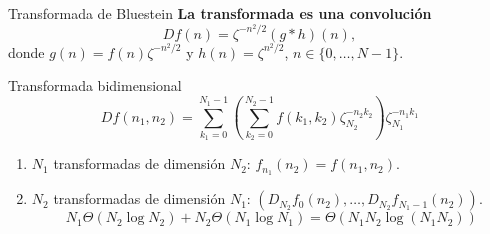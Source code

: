 \documentclass[11pt,compress]{beamer}
\newcommand\C{\mathbb{C}}
\newcommand\Z{\mathbb{Z}}
\newcommand\N{\mathbb{N}}
\begin{document}

\begin{frame}{}

\begin{block}{Transformada de Bluestein}
    \textbf{La transformada es una convolución}
    \[Df(n) = \zeta^{-n^2/2}(g \ast h)(n),\]
    donde $g(n) = f(n) \zeta^{-n^2/2}$ y $h(n) = \zeta^{n^2/2}$, $n \in \{0,\dots,N-1\}$.
\end{block}

\begin{block}{Transformada bidimensional}
    \[ Df(n_1,n_2) = \sum_{k_1=0}^{N_1-1}\left(\sum_{k_2=0}^{N_2-1} f(k_1,k_2)\zeta_{N_2}^{-n_2k_2}\right)\zeta_{N_1}^{-n_1k_1} \]
    
    \begin{enumerate}
        \item $N_1$ transformadas de dimensión $N_2$: $f_{n_1}(n_2) = f(n_1,n_2)$.
        \item $N_2$ transformadas de dimensión $N_1$: $(D_{N_2}f_0(n_2),\dots,D_{N_2}f_{N_1-1}(n_2))$.
        \[ N_1 \Theta(N_2\log N_2) + N_2 \Theta(N_1 \log N_1) = \Theta(N_1N_2 \log(N_1N_2)) \]
    \end{enumerate}

\end{block}



\end{frame}
\end{document}
